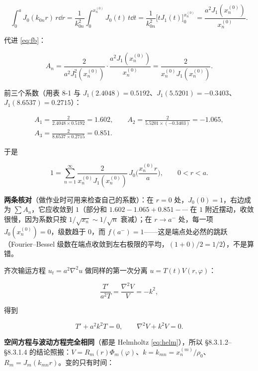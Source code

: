 \[
\int_0^aJ_0(k_{0n}r)\,r\dd r
=\frac1{k_{0n}^2}\int_0^{x_n^{(0)}}J_0(t)\,t\dd t
=\frac1{k_{0n}^2}\Big[tJ_1(t)\Big]_0^{x_n^{(0)}}
=\frac{a^2J_1(x_n^{(0)})}{x_n^{(0)}} .
\]

代进 \eqref{eq:fb}：

\[
A_n=\frac{2}{a^2J_1^2(x_n^{(0)})}\cdot\frac{a^2J_1(x_n^{(0)})}{x_n^{(0)}}=\frac{2}{x_n^{(0)}J_1(x_n^{(0)})}.
\]

前三个系数（用表 8-1 与 $J_1(2.4048)=0.5192$、$J_1(5.5201)=-0.3403$、$J_1(8.6537)=0.2715$）：

\begin{gather*}
A_1=\frac{2}{2.4048\times0.5192}=1.602,\qquad
A_2=\frac{2}{5.5201\times(-0.3403)}=-1.065,\\
A_3=\frac{2}{8.6537\times0.2715}=0.851 .
\end{gather*}

于是

\[
1=\sum_{n=1}^{\infty}\frac{2}{x_n^{(0)}J_1(x_n^{(0)})}\,J_0\Big(\frac{x_n^{(0)}r}{a}\Big),\qquad 0<r<a .
\]

\textbf{两条核对}（做作业时可用来检查自己的系数）：在 $r=0$ 处，$J_0(0)=1$，右边成为 $\sum A_n$，它应收敛到 $1$（部分和 $1.602-1.065+0.851-\cdots$ 在 $1$ 附近摆动，收敛很慢，因为系数只按 $1/\sqrt{x_n}\sim1/\sqrt n$ 衰减）；在 $r\to a^-$ 处，每一项 $J_0(x_n^{(0)})=0$，级数趋于 $0$，而 $f(a^-)=1$——这是端点处必然的跳跃（Fourier--Bessel 级数在端点收敛到左右极限的平均，$(1+0)/2=1/2$），不是算错。


\label{sec:833}



齐次输运方程 $u_t=a^2\nabla^2u$ 做同样的第一次分离 $u=T(t)V(r,\varphi)$：

\[
\frac{T'}{a^2T}=\frac{\nabla^2V}{V}=-k^2 ,
\]

得到

\begin{equation}
T'+a^2k^2T=0,
\qquad
\nabla^2V+k^2V=0 .
\label{eq:transport}
\end{equation}

\textbf{空间方程与波动方程完全相同}（都是 Helmholtz \eqref{eq:helm}），所以 \S8.3.1.2--\S8.3.1.4 的结论照搬：$V=R_m(r)\Phi_m(\varphi)$、$k=k_{mn}=x_n^{(m)}/\rho_0$、$R_m=J_m(k_{mn}r)$。变的只有时间：

